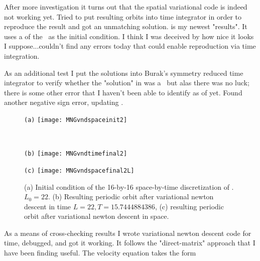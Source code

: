 After more investigation it turns out that the spatial variational code is indeed not working yet. Tried to put
resulting orbits into time integrator in order to reproduce the result and got an unmatching solution.
 is my
newest "results". It uses a  of the \KSe\ as the initial condition. I think I was deceived by how nice it looks
I suppose...couldn't find any errors today that could enable reproduction via time integration.

As an additional test I put the solutions into Burak's symmetry reduced time integrator to verify whether
the "solution" in  was a \rpo\ but alas there was no luck; there is some other error
that I haven't been able to identify as of yet.
Found another negative sign error, updating .


\begin{figure}
\begin{minipage}[height=.32\textheight]{.45\textwidth}
\centering \small{\texttt{(a)}}
\texttt{[image: MNGvndspaceinit2]}
\end{minipage}
\\
\begin{minipage}[height=.32\textheight]{.45\textwidth}
\centering \small{\texttt{(b)}}
\texttt{[image: MNGvndtimefinal2]}
\end{minipage}
\begin{minipage}[height=.32\textheight]{.45\textwidth}
\centering \small{\texttt{(c)}}
\texttt{[image: MNGvndspacefinal2L]}
\end{minipage}
\caption{ \label{fig:MNGspaceandtime1}
(a) Initial condition of the 16-by-16 space-by-time discretization of
. $L_0 = 22$.
(b) Resulting periodic orbit after variational {newton descent} in time $L =
22, T = 15.7444884386$,
(c) resulting periodic orbit after variational {newton descent} in space.
}
\end{figure}

As a means of cross-checking results I wrote variational {newton descent} code for time, debugged, and got it working. It follows the "direct-matrix" approach
that I have been finding useful.
The velocity equation takes the form

